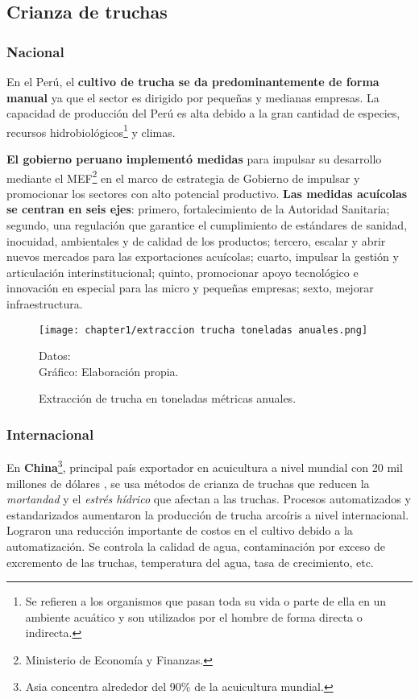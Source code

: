 \subsection{Crianza de truchas}

\subsubsection{Nacional}
En el Perú, el \textbf{cultivo de trucha se da predominantemente de forma manual} ya que el sector es dirigido por pequeñas y medianas empresas. La capacidad de producción del Perú es alta debido a la gran cantidad de especies, recursos hidrobiológicos\footnote{Se refieren a los organismos que pasan toda su vida o parte de ella en un ambiente acuático y son utilizados por el hombre de forma directa o indirecta.\cite{MINAGRI2011}} y climas.

\textbf{El gobierno peruano implementó medidas} para impulsar su desarrollo mediante el MEF\footnote{Ministerio de Economía y Finanzas.}  en el marco de estrategia de Gobierno de impulsar y promocionar los sectores con alto potencial productivo. \textbf{Las medidas acuícolas se centran en seis ejes}: primero, fortalecimiento de la Autoridad Sanitaria; segundo, una regulación que garantice el cumplimiento de estándares de sanidad, inocuidad, ambientales y de calidad de los productos; tercero, escalar y abrir nuevos mercados para las exportaciones acuícolas; cuarto, impulsar la gestión y articulación interinstitucional; quinto, promocionar apoyo tecnológico e innovación en especial para las micro y pequeñas empresas; sexto, mejorar infraestructura. \cite{Andina2019}

\begin{figure}[H]
	\centering
	\texttt{[image: chapter1/extraccion trucha toneladas anuales.png]}
	\caption{Extracción de trucha en toneladas métricas anuales.}
	 Datos: \cite{MinisteriodelaProducciondelPeru2018} 	 \\ 
	 Gráfico: Elaboración propia.
	\label{fig:Extracción de trucha en toneladas métricas anuales}
\end{figure}

\subsubsection{Internacional}

En \textbf{China}\footnote{Asia concentra alrededor del 90\% de la acuicultura mundial.\cite{Powell2003}}, principal país exportador en acuicultura a nivel mundial con 20 mil millones de dólares \cite[p.~44]{FAO2017}, se usa métodos de crianza de truchas que reducen la \textit{mortandad} y el \textit{estrés hídrico} que afectan a las truchas. Procesos automatizados y estandarizados aumentaron la producción de trucha arcoíris a nivel internacional. Lograron una reducción importante de costos en el cultivo debido a la automatización. Se controla la calidad de agua, contaminación por exceso de excremento de las truchas, temperatura del agua, tasa de crecimiento, etc. \cite[p.~1-6]{2017}

